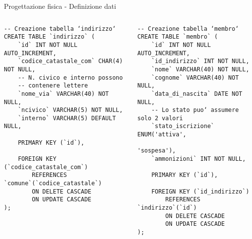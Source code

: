 \begin{frame}[fragile]{Progettazione fisica - Definizione dati}
    \begin{columns}[T]
        \begin{column}[T]{.45\textwidth}
            \begin{verbatim}
-- Creazione tabella ‘indirizzo‘
CREATE TABLE `indirizzo` (
    `id` INT NOT NULL AUTO_INCREMENT,
    `codice_catastale_com` CHAR(4) NOT NULL,
    -- N. civico e interno possono
    -- contenere lettere
    `nome_via` VARCHAR(40) NOT NULL,
    `ncivico` VARCHAR(5) NOT NULL,
    `interno` VARCHAR(5) DEFAULT NULL,

    PRIMARY KEY (`id`),

    FOREIGN KEY (`codice_catastale_com`)
        REFERENCES `comune`(`codice_catastale`)
        ON DELETE CASCADE
        ON UPDATE CASCADE
);
            \end{verbatim}
        \end{column}
        \begin{column}[T]{.45\textwidth}
            \begin{verbatim}
-- Creazione tabella ‘membro‘
CREATE TABLE `membro` (
    `id` INT NOT NULL AUTO_INCREMENT,
    `id_indirizzo` INT NOT NULL,
    `nome` VARCHAR(40) NOT NULL,
    `cognome` VARCHAR(40) NOT NULL,
    `data_di_nascita` DATE NOT NULL,
    -- Lo stato puo‘ assumere solo 2 valori
    `stato_iscrizione` ENUM('attiva',
                            'sospesa'),
    `ammonizioni` INT NOT NULL,

    PRIMARY KEY (`id`),

    FOREIGN KEY (`id_indirizzo`)
        REFERENCES `indirizzo`(`id`)
        ON DELETE CASCADE
        ON UPDATE CASCADE
);
            \end{verbatim}
        \end{column}
    \end{columns}
\end{frame}

